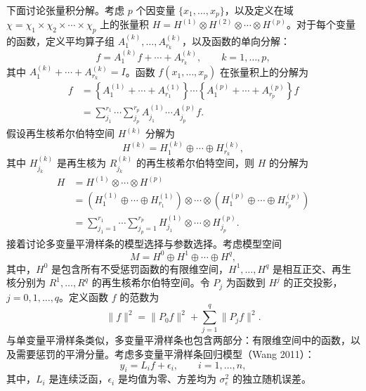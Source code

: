 下面讨论张量积分解。考虑 $p$ 个因变量 $\{x_1,\ldots,x_p\}$，以及定义在域 $\chi=\chi_1\times\chi_2\times\cdots\times\chi_p$ 上的张量积 $H=H^{(1)}\otimes H^{(2)}\otimes\cdots\otimes H^{(p)}$。对于每个变量的函数，定义平均算子组 $A_1^{(k)},\ldots,A_{r_k}^{(k)}$，以及函数的单向分解：
\begin{equation}
f=A_1^{(k)}f+\cdots+A_{r_k}^{(k)},\qquad k=1,\ldots,p,\tag{2.A.79}
\end{equation}
其中 $A_1^{(k)}+\cdots+A_{r_k}^{(k)}=I$。函数 $f(x_1,\ldots,x_p)$ 在张量积上的分解为
\begin{equation}
\begin{aligned}
f&=\left\{A_1^{(1)}+\cdots+A_{r_1}^{(1)}\right\}\cdots
   \left\{A_1^{(p)}+\cdots+A_{r_p}^{(p)}\right\}f\\
 &=\sum_{j_1}^{r_1}\cdots\sum_{j_p}^{r_p}
   A_{j_1}^{(1)}\cdots A_{j_p}^{(p)}f.
\end{aligned}\tag{2.A.80}
\end{equation}
假设再生核希尔伯特空间 $H^{(k)}$ 分解为
\begin{equation}
H^{(k)}=H_1^{(k)}\oplus\cdots\oplus H_{r_k}^{(k)},\tag{2.A.81}
\end{equation}
其中 $H_{j_k}^{(k)}$ 是再生核为 $R_{j_k}^{(k)}$ 的再生核希尔伯特空间，则 $H$ 的分解为
\begin{equation}
\begin{aligned}
H&=H^{(1)}\otimes\cdots\otimes H^{(p)}\\
 &=\left(H_1^{(1)}\oplus\cdots\oplus H_{r_1}^{(1)}\right)
   \otimes\cdots\otimes
   \left(H_1^{(p)}\oplus\cdots\oplus H_{r_p}^{(p)}\right)\\
 &=\sum_{j_1=1}^{r_1}\cdots\sum_{j_p=1}^{r_p}
   H_{j_1}^{(1)}\otimes\cdots\otimes H_{j_p}^{(p)}.
\end{aligned}\tag{2.A.82}
\end{equation}
接着讨论多变量平滑样条的模型选择与参数选择。考虑模型空间
\begin{equation}
M=H^0\oplus H^1\oplus\cdots\oplus H^q,\tag{2.A.83}
\end{equation}
其中，$H^0$ 是包含所有不受惩罚函数的有限维空间，$H^1,\ldots,H^q$ 是相互正交、再生核分别为 $R^1,\ldots,R^q$ 的再生核希尔伯特空间。令 $P_j$ 为函数到 $H^j$ 的正交投影，$j=0,1,\ldots,q$。定义函数 $f$ 的范数为
\begin{equation}
\|f\|^2=\|P_0f\|^2+\sum_{j=1}^q\|P_jf\|^2.\tag{2.A.84}
\end{equation}
与单变量平滑样条类似，多变量平滑样条也包含两部分：有限维空间中的函数，以及需要惩罚的平滑分量。考虑多变量平滑样条回归模型（Wang 2011）：
\begin{equation}
y_i=L_if+\epsilon_i,\qquad i=1,\ldots,n,\tag{2.A.85}
\end{equation}
其中，$L_i$ 是连续泛函，$\epsilon_i$ 是均值为零、方差均为 $\sigma_\epsilon^2$ 的独立随机误差。

